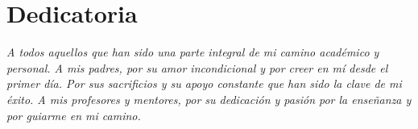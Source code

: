 \chapter*{Dedicatoria}
\vspace*{0.4\textheight}
{\hfill{\Large{\emph{A todos aquellos que han sido una parte integral de mi camino académico y personal. A mis padres, por su amor incondicional y por creer en mí desde el primer día. Por sus sacrificios y su apoyo constante que han sido la clave de mi éxito. A mis profesores y mentores, por su dedicación y pasión por la enseñanza y por guiarme en mi camino.  }}}}
